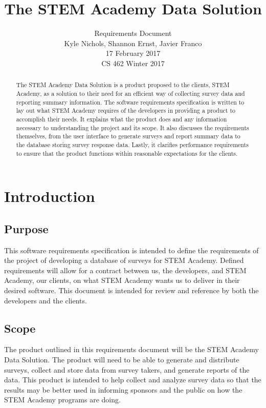 \documentclass[letterpaper,10pt,serif, draftclsnofoot,onecolumn, compsoc, titlepage]{IEEEtran}
\title{The STEM Academy Data Solution}
\author{Requirements Document \\ Kyle Nichols, Shannon Ernst, Javier Franco\\ 17 February 2017\\ CS 462 Winter 2017}
\begin{document}
\maketitle

\begin{abstract}
The STEM Academy Data Solution is a product proposed to the clients, STEM Academy, as a solution to their need for an efficient way of collecting survey data and reporting summary information.
The software requirements specification is written to lay out what STEM Academy requires of the developers in providing a product to accomplish their needs.
It explains what the product does and any information necessary to understanding the project and its scope.
It also discusses the requirements themselves, from the user interface to generate surveys and report summary data to the database storing survey response data.
Lastly, it clarifies performance requirements to ensure that the product functions within reasonable expectations for the clients.
\end{abstract}
\newpage
\tableofcontents
\newpage

\section{Introduction}
\subsection{Purpose}
This software requirements specification is intended to define the requirements of the project of developing a database 
of surveys for STEM Academy. Defined requirements will allow for a contract between us, the developers, and STEM Academy, 
our clients, on what STEM Academy wants us to deliver in their desired software. This document is intended for review and
reference by both the developers and the clients.
\subsection{Scope}
The product outlined in this requirements document will be the STEM Academy Data Solution. The product will need to be able
to generate and distribute surveys, collect and store data from survey takers, and generate reports of the data.  This product
is intended to help collect and analyze survey data so that the results may be better used in informing sponsors and the public on
how the STEM Academy programs are doing. 
\end{document}
